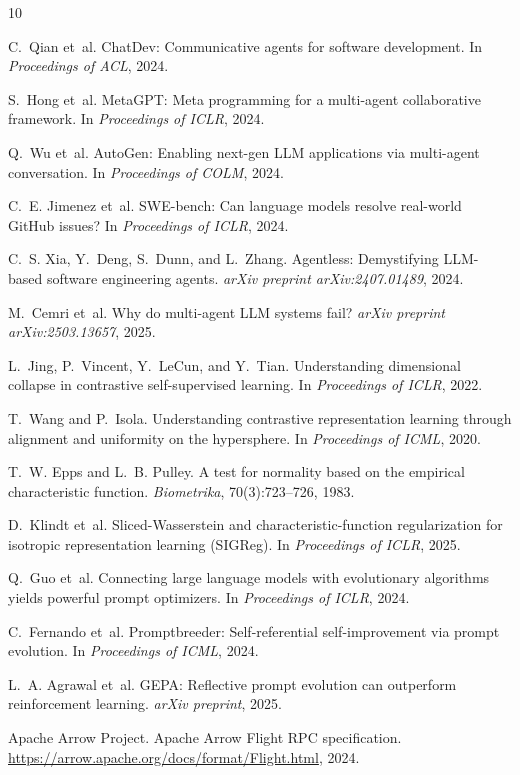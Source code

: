 \documentclass[11pt]{article}
\begin{document}
\begin{thebibliography}{10}

C.~Qian et~al.
\newblock ChatDev: Communicative agents for software development.
\newblock In \emph{Proceedings of ACL}, 2024.

S.~Hong et~al.
\newblock MetaGPT: Meta programming for a multi-agent collaborative framework.
\newblock In \emph{Proceedings of ICLR}, 2024.

Q.~Wu et~al.
\newblock AutoGen: Enabling next-gen LLM applications via multi-agent conversation.
\newblock In \emph{Proceedings of COLM}, 2024.

C.~E. Jimenez et~al.
\newblock SWE-bench: Can language models resolve real-world GitHub issues?
\newblock In \emph{Proceedings of ICLR}, 2024.

C.~S. Xia, Y.~Deng, S.~Dunn, and L.~Zhang.
\newblock Agentless: Demystifying LLM-based software engineering agents.
\newblock \emph{arXiv preprint arXiv:2407.01489}, 2024.

M.~Cemri et~al.
\newblock Why do multi-agent LLM systems fail?
\newblock \emph{arXiv preprint arXiv:2503.13657}, 2025.

L.~Jing, P.~Vincent, Y.~LeCun, and Y.~Tian.
\newblock Understanding dimensional collapse in contrastive self-supervised learning.
\newblock In \emph{Proceedings of ICLR}, 2022.

T.~Wang and P.~Isola.
\newblock Understanding contrastive representation learning through alignment and uniformity on the hypersphere.
\newblock In \emph{Proceedings of ICML}, 2020.

T.~W. Epps and L.~B. Pulley.
\newblock A test for normality based on the empirical characteristic function.
\newblock \emph{Biometrika}, 70(3):723--726, 1983.

D.~Klindt et~al.
\newblock Sliced-Wasserstein and characteristic-function regularization for isotropic representation learning (SIGReg).
\newblock In \emph{Proceedings of ICLR}, 2025.

Q.~Guo et~al.
\newblock Connecting large language models with evolutionary algorithms yields powerful prompt optimizers.
\newblock In \emph{Proceedings of ICLR}, 2024.

C.~Fernando et~al.
\newblock Promptbreeder: Self-referential self-improvement via prompt evolution.
\newblock In \emph{Proceedings of ICML}, 2024.

L.~A. Agrawal et~al.
\newblock GEPA: Reflective prompt evolution can outperform reinforcement learning.
\newblock \emph{arXiv preprint}, 2025.

Apache Arrow Project.
\newblock Apache Arrow Flight RPC specification.
\newblock \url{https://arrow.apache.org/docs/format/Flight.html}, 2024.

\end{thebibliography}
\end{document}
